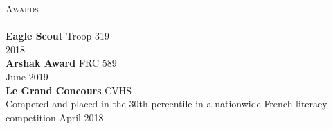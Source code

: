 \documentclass[a4paper]{article}
\newcommand{\lineunder} {
    \vspace*{-8pt} \\
    \hspace*{-18pt} \hrulefill \\
}
\newcommand{\header} [1] {
    {\hspace*{-18pt}\vspace*{6pt} \textsc{#1}}
    \vspace*{-6pt} \lineunder
}
\begin{document}
\header{Awards}
\textbf{Eagle Scout} \hfill Troop 319\\
\hfill 2018\\
\vspace*{2mm}
\textbf{Arshak Award} \hfill FRC 589\\
\hfill June 2019\\
\vspace*{2mm}
\textbf{Le Grand Concours} \hfill CVHS\\
Competed and placed in the 30th percentile in a nationwide French literacy competition \hfill April 2018\\
\vspace*{2mm}

\ 
\end{document}
